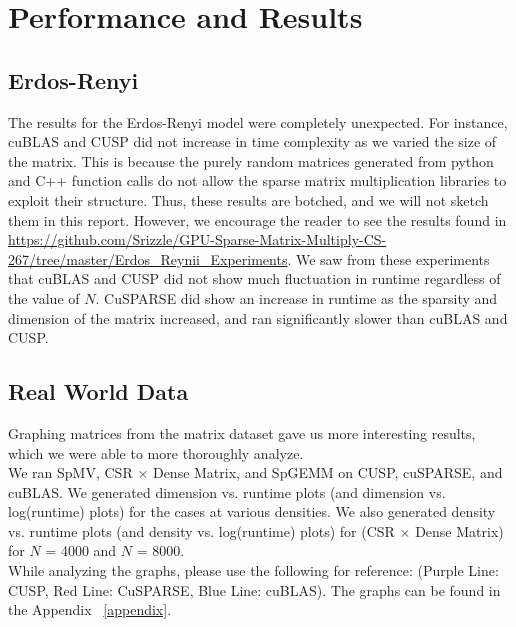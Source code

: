 \documentclass[12pt]{article}
\begin{document}
\section{Performance and Results}


\subsection{Erdos-Renyi}
\hspace{0.5cm}The results for the Erdos-Renyi model were completely unexpected. For instance, cuBLAS and CUSP did not increase in time complexity as we varied the size of the matrix. This is because the purely random matrices generated  from python and C++ function calls do not allow the sparse matrix multiplication libraries to exploit their structure. Thus, these results are botched, and we will not sketch them in this report. However, we encourage the reader to see the results found in \url{https://github.com/Srizzle/GPU-Sparse-Matrix-Multiply-CS-267/tree/master/Erdos_Reynii_Experiments}. We saw from these experiments that cuBLAS and CUSP did not show much fluctuation in runtime regardless of the value of $N$. CuSPARSE did show an increase in runtime as the sparsity and dimension of the matrix increased, and ran significantly slower than cuBLAS and CUSP. 

\subsection{Real World Data}
\hspace{0.5cm}Graphing matrices from the matrix dataset gave us more interesting results, which we were able to more thoroughly analyze.\\
We ran  SpMV, CSR $\times$ Dense Matrix, and SpGEMM on CUSP, cuSPARSE, and cuBLAS. We generated dimension vs. runtime plots (and dimension vs. log(runtime) plots) for the cases at various densities. We also generated density vs. runtime plots (and density vs. log(runtime) plots) for (CSR $\times$ Dense Matrix) for $N$ = 4000 and $N$ = 8000.\\ While analyzing the graphs, please use the following for reference:
(Purple Line: CUSP, Red Line: CuSPARSE, Blue Line: cuBLAS). The graphs can be found in the Appendix ~\ref{appendix}.
\end{document}
